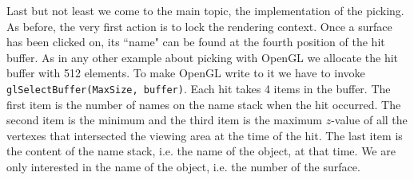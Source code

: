 \documentclass[jou,noapacite]{apa}
\begin{document}
Last but not least we come to the main topic, the implementation of the picking.
%
As before, the very first action is to lock the rendering context.
%
Once a surface has been clicked on, its ``name" can be found at the fourth
position of the hit buffer.
%
As in any other example about picking with OpenGL we allocate the hit buffer
with 512 elements.
%
To make OpenGL write to it we have to invoke \lstinline|glSelectBuffer(MaxSize, buffer)|.
Each hit takes 4 items in the buffer.
%
The first item is the number of names on the name stack when the hit occurred.
%
The second item is the minimum and the third item is the maximum $z$-value of
all the vertexes that intersected the viewing area at the time of the hit.
%
The last item is the content of the name stack, i.e. the name of the object,
at that time.
%
We are only interested in the name of the object, i.e. the number of the
surface.
\end{document}
